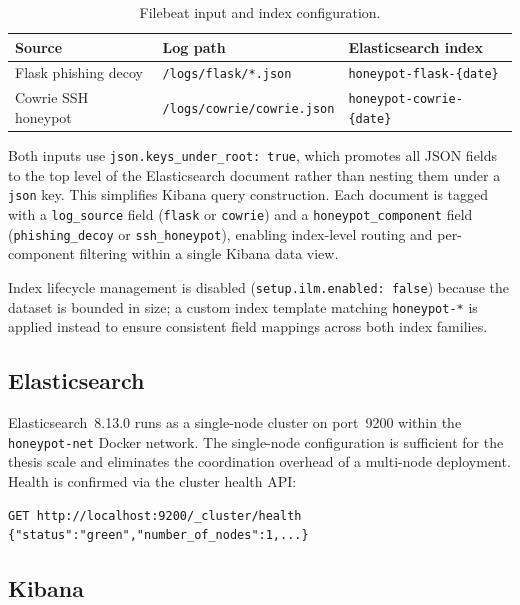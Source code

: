 \begin{table}[h]
\centering
\caption{Filebeat input and index configuration.}
\label{tab:filebeat}
\begin{tabular}{lll}
\hline
\textbf{Source} & \textbf{Log path} & \textbf{Elasticsearch index} \\
\hline
Flask phishing decoy & \texttt{/logs/flask/*.json}        & \texttt{honeypot-flask-\{date\}} \\
Cowrie SSH honeypot  & \texttt{/logs/cowrie/cowrie.json}  & \texttt{honeypot-cowrie-\{date\}} \\
\hline
\end{tabular}
\end{table}

Both inputs use \texttt{json.keys\_under\_root: true}, which promotes all JSON
fields to the top level of the Elasticsearch document rather than nesting them
under a \texttt{json} key. This simplifies Kibana query construction. Each
document is tagged with a \texttt{log\_source} field (\texttt{flask} or
\texttt{cowrie}) and a \texttt{honeypot\_component} field
(\texttt{phishing\_decoy} or \texttt{ssh\_honeypot}), enabling index-level
routing and per-component filtering within a single Kibana data view.

Index lifecycle management is disabled (\texttt{setup.ilm.enabled: false})
because the dataset is bounded in size; a custom index template matching
\texttt{honeypot-*} is applied instead to ensure consistent field mappings
across both index families.

\subsection{Elasticsearch}

Elasticsearch~8.13.0 runs as a single-node cluster on port~9200 within the
\texttt{honeypot-net} Docker network. The single-node configuration is
sufficient for the thesis scale and eliminates the coordination overhead of a
multi-node deployment. Health is confirmed via the cluster health API\@:

\begin{verbatim}
GET http://localhost:9200/_cluster/health
{"status":"green","number_of_nodes":1,...}
\end{verbatim}

\subsection{Kibana}

